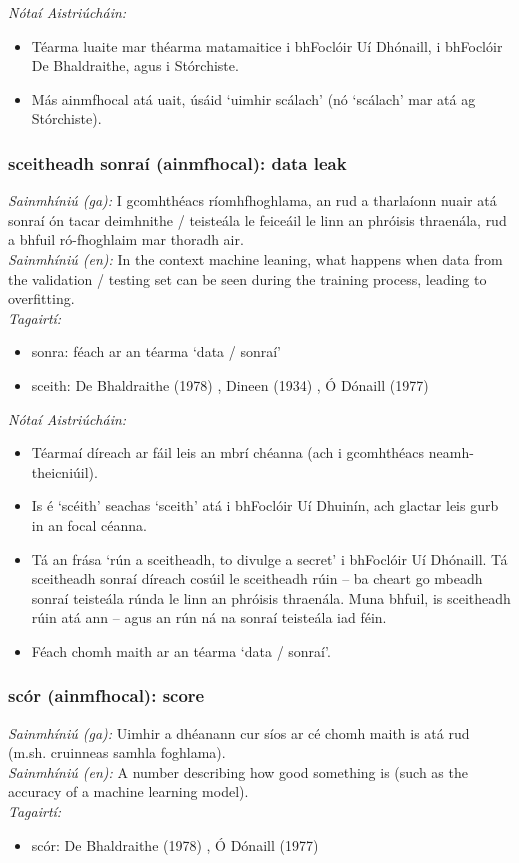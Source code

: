 \documentclass{article}
\begin{document}
 \noindent \textit{Nótaí Aistriúcháin:}
\begin{itemize}
	\item Téarma luaite mar théarma matamaitice i bhFoclóir Uí Dhónaill, i bhFoclóir De Bhaldraithe, agus i Stórchiste.
	\item Más ainmfhocal atá uait, úsáid `uimhir scálach' (nó `scálach' mar atá ag Stórchiste).
\end{itemize}


\subsubsection*{sceitheadh sonraí (ainmfhocal): data leak}
 \noindent \textit{Sainmhíniú (ga):} I gcomhthéacs ríomhfhoghlama, an rud a tharlaíonn nuair atá sonraí ón tacar deimhnithe / teisteála le feiceáil le linn an phróisis thraenála, rud a bhfuil ró-fhoghlaim mar thoradh air.
\\
 \noindent \textit{Sainmhíniú (en):} In the context machine leaning, what happens when data from the validation / testing set can be seen during the training process, leading to overfitting.
\\
 \noindent \textit{Tagairtí:}
\begin{itemize}
	\item sonra: féach ar an téarma `data / sonraí'
	\item sceith: De Bhaldraithe (1978) \cite{de-bhaldraithe}, Dineen (1934) \cite{dineen}, Ó Dónaill (1977) \cite{odonaill}
\end{itemize}

 \noindent \textit{Nótaí Aistriúcháin:}
\begin{itemize}
	\item Téarmaí díreach ar fáil leis an mbrí chéanna (ach i gcomhthéacs neamh-theicniúil).
	\item Is é `scéith' seachas `sceith' atá i bhFoclóir Uí Dhuinín, ach glactar leis gurb in an focal céanna.
	\item Tá an frása `rún a sceitheadh, to divulge a secret' i bhFoclóir Uí Dhónaill. Tá sceitheadh sonraí díreach cosúil le sceitheadh rúin -- ba cheart go mbeadh sonraí teisteála rúnda le linn an phróisis thraenála. Muna bhfuil, is sceitheadh rúin atá ann -- agus an rún ná na sonraí teisteála iad féin.
	\item Féach chomh maith ar an téarma `data / sonraí'.
\end{itemize}


\subsubsection*{scór (ainmfhocal): score}
 \noindent \textit{Sainmhíniú (ga):} Uimhir a dhéanann cur síos ar cé chomh maith is atá rud (m.sh. cruinneas samhla foghlama).
\\
 \noindent \textit{Sainmhíniú (en):} A number describing how good something is (such as the accuracy of a machine learning model).
\\
 \noindent \textit{Tagairtí:}
\begin{itemize}
	\item scór: De Bhaldraithe (1978) \cite{de-bhaldraithe}, Ó Dónaill (1977) \cite{odonaill}
\end{itemize}
\end{document}
